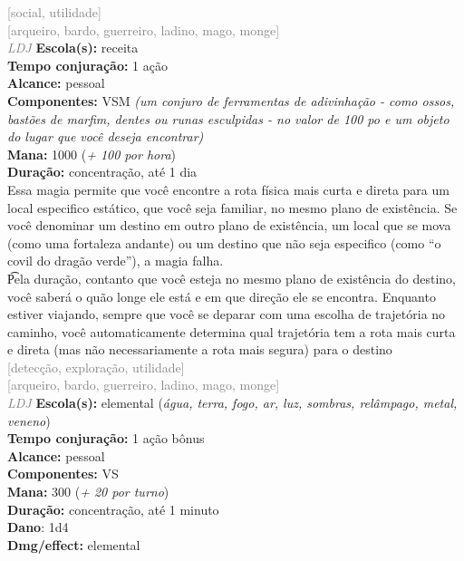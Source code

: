 \documentclass{RPG_Adventure}[2021/10/20]
\begin{document}
{\scriptsize \textcolor{gray}{[social, utilidade]\\}}
{\scriptsize \textcolor{gray}{[arqueiro, bardo, guerreiro, ladino, mago, monge]\\}}
{\tiny \textcolor{gray}{\textit{LDJ}}}\jump{}
{\small \t \textbf{Escola(s):} receita\\\t \textbf{Tempo conjuração:} 1 ação\\\t \textbf{Alcance:} pessoal\\\t \textbf{Componentes:} VSM \textit{(um conjuro de ferramentas de adivinhação - como ossos, bastões de marfim, dentes ou runas esculpidas - no valor de 100 po e um objeto do lugar que você deseja encontrar)}\\\t \textbf{Mana:} 1000 (\textit{+ 100 por hora})\\\t \textbf{Duração:} concentração, até 1 dia\\}
{\normalsize Essa magia permite que você encontre a rota física mais curta e direta para um local especifico estático, que você seja familiar, no mesmo plano de existência. Se você denominar um destino em outro plano de existência, um local que se mova (como uma fortaleza andante) ou um destino que não seja especifico (como “o covil do dragão verde”), a magia falha.\\\t Pela duração, contanto que você esteja no mesmo plano de existência do destino, você saberá o quão longe ele está e em que direção ele se encontra. Enquanto estiver viajando, sempre que você se deparar com uma escolha de trajetória no caminho, você automaticamente determina qual trajetória tem a rota mais curta e direta (mas não necessariamente a rota mais segura) para o destino\\}
{\scriptsize \textcolor{gray}{[detecção, exploração, utilidade]\\}}
{\scriptsize \textcolor{gray}{[arqueiro, bardo, guerreiro, ladino, mago, monge]\\}}
{\tiny \textcolor{gray}{\textit{LDJ}}}\jump{}
{\small \t \textbf{Escola(s):} elemental (\textit{água, terra, fogo, ar, luz, sombras, relâmpago, metal, veneno})\\\t \textbf{Tempo conjuração:} 1 ação bônus\\\t \textbf{Alcance:} pessoal\\\t \textbf{Componentes:} VS\\\t \textbf{Mana:} 300 (\textit{+ 20 por turno})\\\t \textbf{Duração:} concentração, até 1 minuto\\\t \textbf{Dano}: 1d4\\\t \textbf{Dmg/effect:} elemental\\}
\end{document}
